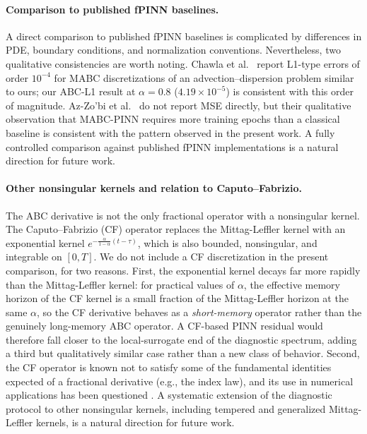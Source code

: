 \documentclass[11pt]{article}
\begin{document}
\paragraph{Comparison to published fPINN baselines.}
A direct comparison to published fPINN baselines is complicated by
differences in PDE, boundary conditions, and normalization conventions.
Nevertheless, two qualitative consistencies are worth noting.
Chawla et al.~\cite{Chawla2022} report L1-type errors of order
\(10^{-4}\) for MABC discretizations of an advection--dispersion problem
similar to ours; our ABC-L1 result at \(\alpha=0.8\)
(\(4.19\times 10^{-5}\)) is consistent with this order of magnitude.
Az-Zo'bi et al.~\cite{AzZobi2025} do not report MSE directly, but their
qualitative observation that MABC-PINN requires more training epochs
than a classical baseline is consistent with the pattern observed in
the present work. A fully controlled comparison against published
fPINN implementations is a natural direction for future work.

\paragraph{Other nonsingular kernels and relation to Caputo--Fabrizio.}
The ABC derivative is not the only fractional operator with a nonsingular kernel. The Caputo--Fabrizio (CF) operator \cite{CaputoFabrizio2015} replaces the Mittag-Leffler kernel with an exponential kernel \(e^{-\frac{\alpha}{1-\alpha}(t-\tau)}\), which is also bounded, nonsingular, and integrable on \([0,T]\). We do not include a CF discretization in the present comparison, for two reasons. First, the exponential kernel decays far more rapidly than the Mittag-Leffler kernel: for practical values of \(\alpha\), the effective memory horizon of the CF kernel is a small fraction of the Mittag-Leffler horizon at the same \(\alpha\), so the CF derivative behaves as a \emph{short-memory} operator rather than the genuinely long-memory ABC operator. A CF-based PINN residual would therefore fall closer to the local-surrogate end of the diagnostic spectrum, adding a third but qualitatively similar case rather than a new class of behavior. Second, the CF operator is known not to satisfy some of the fundamental identities expected of a fractional derivative (e.g., the index law), and its use in numerical applications has been questioned \cite{Diethelm2020}. A systematic extension of the diagnostic protocol to other nonsingular kernels, including tempered and generalized Mittag-Leffler kernels, is a natural direction for future work.
\end{document}
